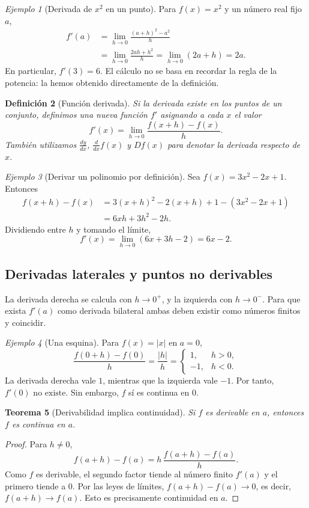 \documentclass[12pt]{article}
\newtheorem{definicion}{Definición}[section]
\newtheorem{teorema}[definicion]{Teorema}
\theoremstyle{remark}
\newtheorem{ejemplo}[definicion]{Ejemplo}
\begin{document}
\begin{ejemplo}[Derivada de $x^2$ en un punto]
Para $f(x)=x^2$ y un número real fijo $a$,
\begin{align*}
f'(a)&=\lim_{h\to0}\frac{(a+h)^2-a^2}{h}\\
&=\lim_{h\to0}\frac{2ah+h^2}{h}
=\lim_{h\to0}(2a+h)=\boxed{2a}.
\end{align*}
En particular, $f'(3)=6$. El cálculo no se basa en recordar la regla de la potencia: la hemos obtenido directamente de la definición.
\end{ejemplo}

\begin{definicion}[Función derivada]
Si la derivada existe en los puntos de un conjunto, definimos una nueva función $f'$ asignando a cada $x$ el valor
\[
\boxed{f'(x)=\lim_{h\to0}\frac{f(x+h)-f(x)}{h}.}
\]
También utilizamos $\displaystyle\frac{dy}{dx}$, $\displaystyle\frac{d}{dx}f(x)$ y $Df(x)$ para denotar la derivada respecto de $x$.
\end{definicion}

\begin{ejemplo}[Derivar un polinomio por definición]
Sea $f(x)=3x^2-2x+1$. Entonces
\begin{align*}
f(x+h)-f(x)
&=3(x+h)^2-2(x+h)+1-(3x^2-2x+1)\\
&=6xh+3h^2-2h.
\end{align*}
Dividiendo entre $h$ y tomando el límite,
\[
f'(x)=\lim_{h\to0}(6x+3h-2)=\boxed{6x-2}.
\]
\end{ejemplo}

\subsection*{Derivadas laterales y puntos no derivables}
La derivada derecha se calcula con $h\to0^+$, y la izquierda con $h\to0^-$. Para que exista $f'(a)$ como derivada bilateral ambas deben existir como números finitos y coincidir.

\begin{ejemplo}[Una esquina]
Para $f(x)=|x|$ en $a=0$,
\[
\frac{f(0+h)-f(0)}h=\frac{|h|}{h}
=\begin{cases}1,&h>0,\\-1,&h<0.\end{cases}
\]
La derivada derecha vale $1$, mientras que la izquierda vale $-1$. Por tanto, $\boxed{f'(0)\text{ no existe}}$. Sin embargo, $f$ sí es continua en $0$.
\end{ejemplo}

\begin{teorema}[Derivabilidad implica continuidad]
Si $f$ es derivable en $a$, entonces $f$ es continua en $a$.
\end{teorema}
\begin{proof}
Para $h\ne0$,
\[
f(a+h)-f(a)=h\,\frac{f(a+h)-f(a)}h.
\]
Como $f$ es derivable, el segundo factor tiende al número finito $f'(a)$ y el primero tiende a $0$. Por las leyes de límites, $f(a+h)-f(a)\to0$, es decir, $f(a+h)\to f(a)$. Esto es precisamente continuidad en $a$.
\end{proof}
\end{document}
